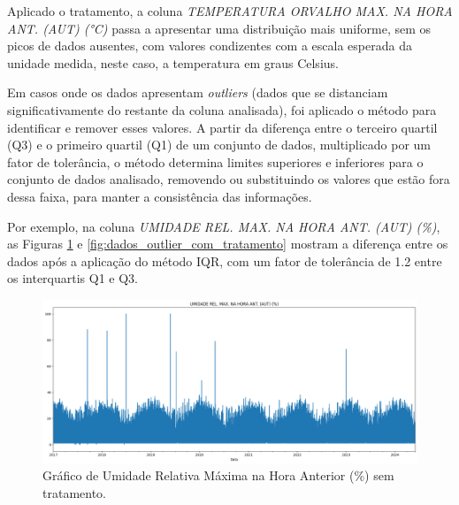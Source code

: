 Aplicado o tratamento, a coluna \textit{TEMPERATURA ORVALHO MAX. NA HORA ANT. (AUT) (°C)} passa a apresentar uma distribuição mais uniforme, sem os picos de dados ausentes, com valores condizentes com a escala esperada da unidade medida, neste caso, a temperatura em graus Celsius.

Em casos onde os dados apresentam \textit{outliers} (dados que se distanciam significativamente do restante da coluna analisada), foi aplicado o método  para identificar e remover esses valores. A partir da diferença entre o terceiro quartil (Q3) e o primeiro quartil (Q1) de um conjunto de dados, multiplicado por um fator de tolerância, o método determina limites superiores e inferiores para o conjunto de dados analisado, removendo ou substituindo os valores que estão fora dessa faixa, para manter a consistência das informações.

Por exemplo, na coluna \textit{UMIDADE REL. MAX. NA HORA ANT. (AUT) (\%)}, as Figuras \ref{fig:dados_outlier_sem_tratamento} e \ref{fig:dados_outlier_com_tratamento} mostram a diferença entre os dados após a aplicação do método \gls{IQR}, com um fator de tolerância de 1.2 entre os interquartis Q1 e Q3.

\begin{figure}[H]
	\caption{\label{fig:dados_outlier_sem_tratamento}Gráfico de Umidade Relativa Máxima  na Hora Anterior (\%) sem tratamento.}
	\begin{center}
		\includegraphics[scale=0.35]{figuras/UMIDADE REL. MAX. NA HORA ANT. (AUT) SEM TRATAMENTO.png}
	\end{center}
\end{figure}

